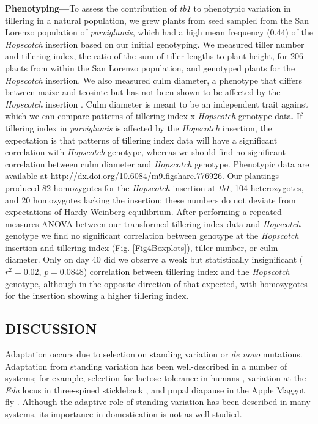 \documentclass[11pt]{article} %
\begin{document}
\begin{linenumbers}
\begin{flushleft}
\textbf{Phenotyping---}To assess the contribution of \emph{tb1} to phenotypic variation in tillering in a natural population, we grew plants from seed sampled from the San Lorenzo population of \emph{parviglumis}, which had a high mean frequency (0.44) of the \emph{Hopscotch} insertion based on our initial genotyping. 
We measured tiller number and tillering index, the ratio of the sum of tiller lengths to plant height, for 206 plants from within the San Lorenzo population, and genotyped plants for the \emph{Hopscotch} insertion. 
We also measured culm diameter, a phenotype that differs between maize and teosinte but has not been shown to be affected by the \emph{Hopscotch} insertion \citep{Briggs2007}. Culm diameter is meant to be an independent trait against which we can compare patterns of tillering index x \emph{Hopscotch} genotype data. If tillering index in \emph{parviglumis} is affected by the \emph{Hopscotch} insertion, the expectation is that patterns of tillering index data will have a significant correlation with \emph{Hopscotch} genotype, whereas we should find no significant correlation between culm diameter and \emph{Hopscotch} genotype. 
Phenotypic data are available at \url{http://dx.doi.org/10.6084/m9.figshare.776926}. 
Our plantings produced 82 homozygotes for the \emph{Hopscotch} insertion at \emph{tb1}, 104 heterozygotes, and 20 homozygotes lacking the insertion; these numbers do not deviate from expectations of Hardy-Weinberg equilibrium. 
After performing a repeated measures ANOVA between our transformed tillering index data and \emph{Hopscotch} genotype we find no significant correlation between genotype at the \emph{Hopscotch} insertion and tillering index (Fig. \ref{Fig4Boxplots}), tiller number, or culm diameter. 
Only on day 40 did we observe a weak but statistically insignificant ($r^2= 0.02$, $p=0.0848$) correlation between tillering index and the \emph{Hopscotch} genotype, although in the opposite direction of that expected, with homozygotes for the insertion showing a higher tillering index.

\begin{centering}
\section*{DISCUSSION}
\end{centering}

Adaptation occurs due to selection on standing variation or \emph{de novo} mutations. Adaptation from standing variation has been well-described in a number of systems; for example, selection for lactose tolerance in humans \citep{Plantinga2012, Tishkoff2007}, variation at the \emph{Eda} locus in three-spined stickleback \citep{Kitano2008, Colosimo2005}, and pupal diapause in the Apple Maggot fly \citep{Feder2003}. Although the adaptive role of standing variation has been described in many systems, its importance in domestication is not as well studied. 


\end{flushleft}
\end{linenumbers}
\end{document}
